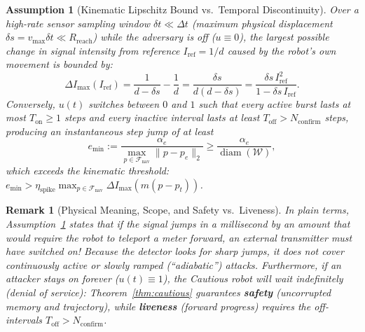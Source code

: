 \documentclass[11pt, a4paper]{article}
\newtheorem{assumption}{Assumption}
\newtheorem{remark}{Remark}
\begin{document}
\begin{assumption}[Kinematic Lipschitz Bound vs.\ Temporal Discontinuity]
\label{assump:discontinuity}
Over a high-rate sensor sampling window $\delta t \ll \Delta t$ (maximum physical displacement $\delta s = v_{\max}\delta t \ll R_{\text{reach}}$) while the adversary is off ($u \equiv 0$), the largest possible change in signal intensity from reference $I_{\text{ref}} = 1/d$ caused by the robot's own movement is bounded by:
\begin{equation}
    \Delta I_{\max}(I_{\text{ref}}) = \frac{1}{d - \delta s} - \frac{1}{d} = \frac{\delta s}{d(d - \delta s)} = \frac{\delta s\, I_{\text{ref}}^2}{1 - \delta s\, I_{\text{ref}}}.
    \label{eq:lipschitz}
\end{equation}
Conversely, $u(t)$ switches between $0$ and $1$ such that every active burst lasts at most $T_{\text{on}} \ge 1$ steps and every inactive interval lasts at least $T_{\text{off}} > N_{\text{confirm}}$ steps, producing an instantaneous step jump of at least
\begin{equation}
    e_{\min} := \frac{\alpha_e}{\max_{p \in \mathcal{F}_{\text{nav}}} \|p - p_e\|_2} \ge \frac{\alpha_e}{\operatorname{diam}(\mathcal{W})},
    \label{eq:emin_short}
\end{equation}
which exceeds the kinematic threshold: $e_{\min} > \eta_{\text{spike}} \max_{p \in \mathcal{F}_{\text{nav}}} \Delta I_{\max}(m(p-p_t))$.
\end{assumption}

\begin{remark}[Physical Meaning, Scope, and Safety vs.\ Liveness]
In plain terms, Assumption~\ref{assump:discontinuity} states that if the signal jumps in a millisecond by an amount that would require the robot to teleport a meter forward, an external transmitter must have switched on! Because the detector looks for sharp jumps, it does not cover continuously active or slowly ramped (``adiabatic'') attacks. Furthermore, if an attacker stays on forever ($u(t) \equiv 1$), the Cautious robot will wait indefinitely (denial of service): Theorem~\ref{thm:cautious} guarantees \textbf{safety} (uncorrupted memory and trajectory), while \textbf{liveness} (forward progress) requires the off-intervals $T_{\text{off}} > N_{\text{confirm}}$.
\end{remark}
\end{document}

